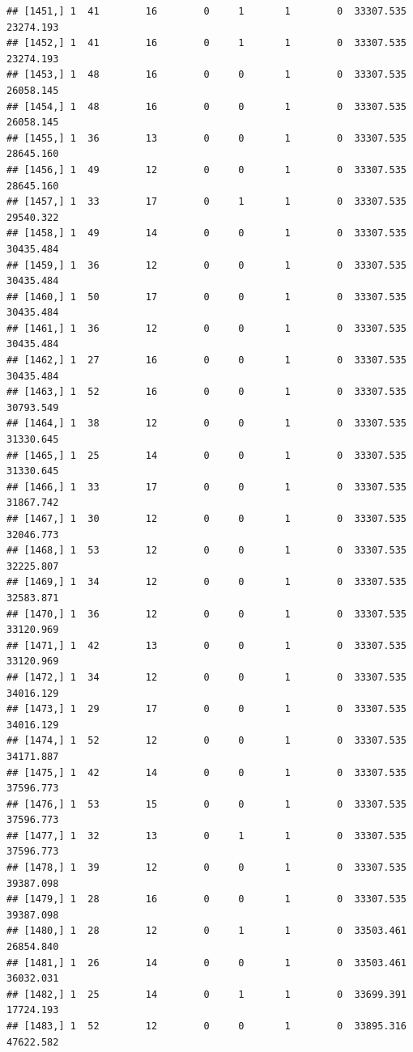 \documentclass[
]{article}
\begin{document}
\begin{verbatim}
## [1451,] 1  41        16        0     1       1        0  33307.535  23274.193
## [1452,] 1  41        16        0     1       1        0  33307.535  23274.193
## [1453,] 1  48        16        0     0       1        0  33307.535  26058.145
## [1454,] 1  48        16        0     0       1        0  33307.535  26058.145
## [1455,] 1  36        13        0     0       1        0  33307.535  28645.160
## [1456,] 1  49        12        0     0       1        0  33307.535  28645.160
## [1457,] 1  33        17        0     1       1        0  33307.535  29540.322
## [1458,] 1  49        14        0     0       1        0  33307.535  30435.484
## [1459,] 1  36        12        0     0       1        0  33307.535  30435.484
## [1460,] 1  50        17        0     0       1        0  33307.535  30435.484
## [1461,] 1  36        12        0     0       1        0  33307.535  30435.484
## [1462,] 1  27        16        0     0       1        0  33307.535  30435.484
## [1463,] 1  52        16        0     0       1        0  33307.535  30793.549
## [1464,] 1  38        12        0     0       1        0  33307.535  31330.645
## [1465,] 1  25        14        0     0       1        0  33307.535  31330.645
## [1466,] 1  33        17        0     0       1        0  33307.535  31867.742
## [1467,] 1  30        12        0     0       1        0  33307.535  32046.773
## [1468,] 1  53        12        0     0       1        0  33307.535  32225.807
## [1469,] 1  34        12        0     0       1        0  33307.535  32583.871
## [1470,] 1  36        12        0     0       1        0  33307.535  33120.969
## [1471,] 1  42        13        0     0       1        0  33307.535  33120.969
## [1472,] 1  34        12        0     0       1        0  33307.535  34016.129
## [1473,] 1  29        17        0     0       1        0  33307.535  34016.129
## [1474,] 1  52        12        0     0       1        0  33307.535  34171.887
## [1475,] 1  42        14        0     0       1        0  33307.535  37596.773
## [1476,] 1  53        15        0     0       1        0  33307.535  37596.773
## [1477,] 1  32        13        0     1       1        0  33307.535  37596.773
## [1478,] 1  39        12        0     0       1        0  33307.535  39387.098
## [1479,] 1  28        16        0     0       1        0  33307.535  39387.098
## [1480,] 1  28        12        0     1       1        0  33503.461  26854.840
## [1481,] 1  26        14        0     0       1        0  33503.461  36032.031
## [1482,] 1  25        14        0     1       1        0  33699.391  17724.193
## [1483,] 1  52        12        0     0       1        0  33895.316  47622.582

\end{verbatim}
\end{document}
